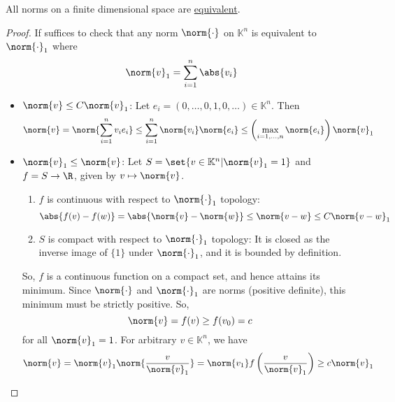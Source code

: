 \documentclass{article}
\newcommand{\K}{\mathbb{K}}
\begin{document}
\begin{prop}
    All norms on a finite dimensional space are \hyperlink{def:eqNorm}{equivalent}.
\end{prop}

\begin{proof}
    If suffices to check that any norm $\norm{\cdot}$ on $\K^n$ is equivalent to $\norm{\cdot}_1$ where
    \begin{equation*}
        \norm{v}_1 = \sum_{i=1}^n \abs{v_i}
    \end{equation*}

    \begin{itemize}
        \item $\norm{v} \leq C \norm{v}_1$: Let $e_i = (0, \dotsc, 0, 1, 0, \dotsc) \in \K^n$. Then
            \begin{equation*}
                \norm{v} = \norm{\sum_{i=1}^n v_i e_i} \leq \sum_{i=1}^n \norm{v_i} \norm{e_i} \leq \left(\max_{i=1,\dotsc,n} \norm{e_i}\right) \norm{v}_1
            \end{equation*}

        \item $\norm{v}_1 \leq \norm{v}$: Let $S = \set{v \in \K^n | \norm{v}_1 = 1}$ and $f = S \to \R$, given by $v \mapsto \norm{v}$.
            \begin{enumerate}
                \item $f$ is continuous with respect to $\norm{\cdot}_1$ topology:
                    \begin{equation*}
                        \abs{f(v) - f(w)} = \abs{\norm{v} - \norm{w}} \leq \norm{v - w} \leq C \norm{v-w}_1
                    \end{equation*}
                \item $S$ is compact with respect to $\norm{\cdot}_1$ topology:
                    It is closed as the inverse image of $\{1\}$ under $\norm{\cdot}_1$, and it is bounded by definition.
            \end{enumerate}
            So, $f$ is a continuous function on a compact set, and hence attains its minimum.
            Since $\norm{\cdot}$ and $\norm{\cdot}_1$ are norms (positive definite), this minimum must be strictly positive.
            So, \begin{equation*}\norm{v} = f(v) \geq f(v_0) = c\end{equation*} for all $\norm{v}_1 = 1$.
            For arbitrary $v \in \K^n$, we have
            \begin{equation*}
                \norm{v} = \norm{v}_1 \norm{\frac{v}{\norm{v}_1}} = \norm{v_1} f\left(\frac{v}{\norm{v}_1}\right) \geq c \norm{v}_1
            \end{equation*}
    \end{itemize}
\end{proof}
\end{document}
